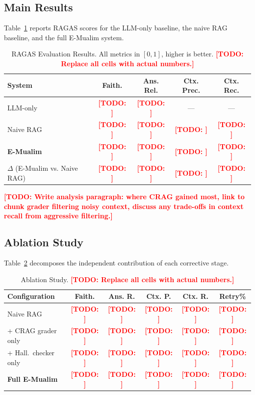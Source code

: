 \documentclass[conference]{IEEEtran}
\newcommand{\todo}[1]{\textcolor{red}{\textbf{[TODO: #1]}}}
\begin{document}
\subsection{Main Results}

Table~\ref{tab:main} reports RAGAS scores for the LLM-only baseline,
the naive RAG baseline, and the full E-Mualim system.

\begin{table}[htbp]
\centering
\caption{RAGAS Evaluation Results. All metrics in $[0,1]$, higher is
better. \todo{Replace all cells with actual numbers.}}
\label{tab:main}
\renewcommand{\arraystretch}{1.2}
\begin{tabular}{lcccc}
\toprule
\textbf{System} & \textbf{Faith.} & \textbf{Ans. Rel.}
                & \textbf{Ctx. Prec.} & \textbf{Ctx. Rec.} \\
\midrule
LLM-only              & \todo{} & \todo{} & ---     & ---     \\
Naive RAG             & \todo{} & \todo{} & \todo{} & \todo{} \\
\textbf{E-Mualim}     & \todo{} & \todo{} & \todo{} & \todo{} \\
\midrule
$\Delta$ (E-Mualim vs. Naive RAG) & \todo{} & \todo{} & \todo{} & \todo{} \\
\bottomrule
\end{tabular}
\end{table}

\todo{Write analysis paragraph: where CRAG gained most, link to
chunk grader filtering noisy context, discuss any trade-offs in
context recall from aggressive filtering.}

\subsection{Ablation Study}

Table~\ref{tab:ablation} decomposes the independent contribution of
each corrective stage.

\begin{table}[htbp]
\centering
\caption{Ablation Study. \todo{Replace all cells with actual numbers.}}
\label{tab:ablation}
\renewcommand{\arraystretch}{1.2}
\begin{tabular}{lccccc}
\toprule
\textbf{Configuration} & \textbf{Faith.} & \textbf{Ans. R.}
  & \textbf{Ctx. P.} & \textbf{Ctx. R.} & \textbf{Retry\%} \\
\midrule
Naive RAG                & \todo{} & \todo{} & \todo{} & \todo{} & \todo{} \\
+ CRAG grader only       & \todo{} & \todo{} & \todo{} & \todo{} & \todo{} \\
+ Hall.\ checker only    & \todo{} & \todo{} & \todo{} & \todo{} & \todo{} \\
\textbf{Full E-Mualim}   & \todo{} & \todo{} & \todo{} & \todo{} & \todo{} \\
\bottomrule
\end{tabular}
\end{table}
\end{document}
